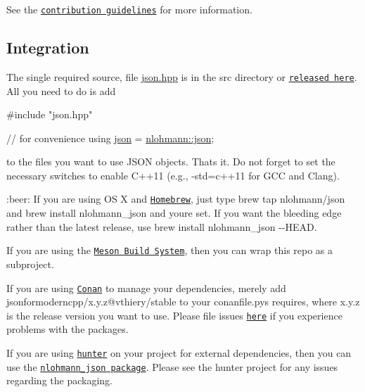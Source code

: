 See the \href{https://github.com/nlohmann/json/blob/master/.github/CONTRIBUTING.md#please-dont}{\tt contribution guidelines} for more information.

\subsection*{Integration}

The single required source, file {\ttfamily \hyperlink{json_8hpp_source}{json.\+hpp}} is in the {\ttfamily src} directory or \href{https://github.com/nlohmann/json/releases}{\tt released here}. All you need to do is add


\begin{DoxyCode}
\textcolor{preprocessor}{#include "json.hpp"}

\textcolor{comment}{// for convenience}
\textcolor{keyword}{using} \hyperlink{classnlohmann_1_1basic__json}{json} = \hyperlink{namespacenlohmann_a2bfd99e845a2e5cd90aeaf1b1431f474}{nlohmann::json};
\end{DoxyCode}


to the files you want to use J\+S\+ON objects. That\textquotesingle{}s it. Do not forget to set the necessary switches to enable C++11 (e.\+g., {\ttfamily -\/std=c++11} for G\+CC and Clang).

\+:beer\+: If you are using OS X and \href{http://brew.sh}{\tt Homebrew}, just type {\ttfamily brew tap nlohmann/json} and {\ttfamily brew install nlohmann\+\_\+json} and you\textquotesingle{}re set. If you want the bleeding edge rather than the latest release, use {\ttfamily brew install nlohmann\+\_\+json -\/-\/\+H\+E\+AD}.

If you are using the \href{http://mesonbuild.com}{\tt Meson Build System}, then you can wrap this repo as a subproject.

If you are using \href{https://www.conan.io/}{\tt Conan} to manage your dependencies, merely add {\ttfamily jsonformoderncpp/x.\+y.\+z@vthiery/stable} to your {\ttfamily conanfile.\+py}\textquotesingle{}s requires, where {\ttfamily x.\+y.\+z} is the release version you want to use. Please file issues \href{https://github.com/vthiery/conan-jsonformoderncpp/issues}{\tt here} if you experience problems with the packages.

If you are using \href{https://github.com/ruslo/hunter/}{\tt hunter} on your project for external dependencies, then you can use the \href{https://github.com/ruslo/hunter/wiki/pkg.nlohmann_json}{\tt nlohmann\+\_\+json package}. Please see the hunter project for any issues regarding the packaging.

